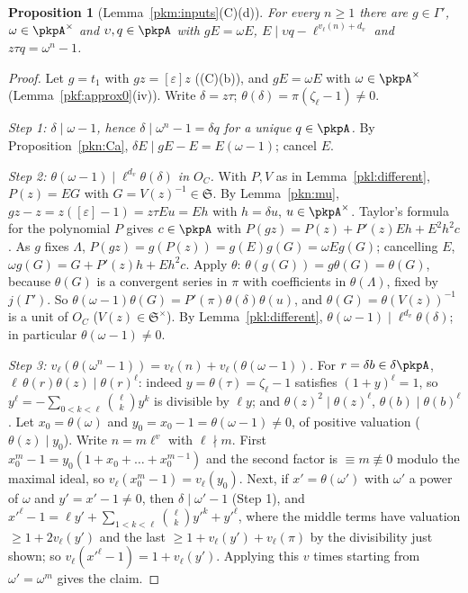 \documentclass[10pt]{amsart}
\newtheorem{proposition}[theorem]{Proposition}
\theoremstyle{definition}
\theoremstyle{remark}
\begin{document}
\begin{proposition}[Lemma~\ref{pkm:inputs}(C)(d)]\label{pkl:Cd}
For every $n\ge1$ there are $g\in\Gamma'$, $\omega\in\pkpA^\times$ and $\upsilon,q\in\pkpA$ with $gE=\omega E$,
$E\mid\upsilon q-\ell^{v_\ell(n)+d_v}$ and $z\tau q=\omega^n-1$.
\end{proposition}

\begin{proof}
Let $g=t_1$ with $gz=[\varepsilon]z$ ((C)(b)), and $gE=\omega E$ with $\omega\in\pkpA^\times$
(Lemma~\ref{pkf:approx0}(iv)). Write $\delta=z\tau$; $\theta(\delta)=\pi(\zeta_\ell-1)\ne0$.

\emph{Step 1: $\delta\mid\omega-1$, hence $\delta\mid\omega^n-1=\delta q$ for a unique $q\in\pkpA$.} By
Proposition~\ref{pkn:Ca}, $\delta E\mid gE-E=E(\omega-1)$; cancel $E$.

\emph{Step 2: $\theta(\omega-1)\mid\ell^{d_v}\theta(\delta)$ in $O_C$.} With $P,V$ as in Lemma~\ref{pkl:different},
$P(z)=EG$ with $G=V(z)^{-1}\in\mathfrak S$. By Lemma~\ref{pkn:mu}, $gz-z=z([\varepsilon]-1)=z\tau Eu=Eh$ with
$h=\delta u$, $u\in\pkpA^\times$. Taylor's formula for the polynomial $P$ gives $c\in\pkpA$ with
$P(gz)=P(z)+P'(z)Eh+E^2h^2c$. As $g$ fixes $\Lambda$, $P(gz)=g(P(z))=g(E)g(G)=\omega Eg(G)$; cancelling $E$,
$\omega g(G)=G+P'(z)h+Eh^2c$. Apply $\theta$: $\theta(g(G))=g\theta(G)=\theta(G)$, because $\theta(G)$ is a
convergent series in $\pi$ with coefficients in $\theta(\Lambda)$, fixed by $j(\Gamma')$. So
$\theta(\omega-1)\theta(G)=P'(\pi)\theta(\delta)\theta(u)$, and $\theta(G)=\theta(V(z))^{-1}$ is a unit of $O_C$
($V(z)\in\mathfrak S^\times$). By Lemma~\ref{pkl:different}, $\theta(\omega-1)\mid\ell^{d_v}\theta(\delta)$; in particular
$\theta(\omega-1)\ne0$.

\emph{Step 3: $v_\ell(\theta(\omega^n-1))=v_\ell(n)+v_\ell(\theta(\omega-1))$.} For $r=\delta b\in\delta\pkpA$,
$\ell\,\theta(r)\theta(z)\mid\theta(r)^\ell$: indeed $y=\theta(\tau)=\zeta_\ell-1$ satisfies $(1+y)^\ell=1$, so
$y^\ell=-\sum_{0<k<\ell}\binom\ell ky^k$ is divisible by $\ell y$; and $\theta(z)^2\mid\theta(z)^\ell$,
$\theta(b)\mid\theta(b)^\ell$. Let $x_0=\theta(\omega)$ and $y_0=x_0-1=\theta(\omega-1)\ne0$, of positive valuation
($\theta(z)\mid y_0$). Write $n=m\ell^v$ with $\ell\nmid m$. First $x_0^m-1=y_0(1+x_0+\dots+x_0^{m-1})$ and the
second factor is $\equiv m\not\equiv0$ modulo the maximal ideal, so $v_\ell(x_0^m-1)=v_\ell(y_0)$. Next, if
$x'=\theta(\omega')$ with $\omega'$ a power of $\omega$ and $y'=x'-1\ne0$, then $\delta\mid\omega'-1$ (Step 1), and
$x'^\ell-1=\ell y'+\sum_{1<k<\ell}\binom\ell ky'^k+y'^\ell$, where the middle terms have valuation $\ge1+2v_\ell(y')$
and the last $\ge1+v_\ell(y')+v_\ell(\pi)$ by the divisibility just shown; so $v_\ell(x'^\ell-1)=1+v_\ell(y')$.
Applying this $v$ times starting from $\omega'=\omega^m$ gives the claim.


\end{proof}
\end{document}
